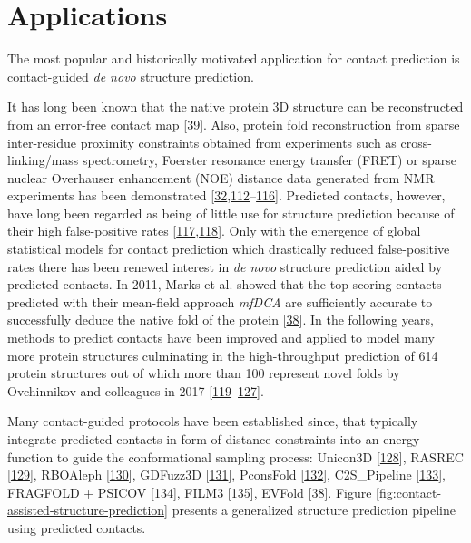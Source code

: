 \documentclass[11pt,a4paper,twoside]{book}
\theoremstyle{definition}
\theoremstyle{definition}
\theoremstyle{remark}
\begin{document}
\section{Applications}\label{application-contact-prediction}

The most popular and historically motivated application for contact
prediction is contact-guided \emph{de novo} structure prediction.

It has long been known that the native protein 3D structure can be
reconstructed from an error-free contact map
{[}\protect\hyperlink{ref-Vendruscolo1997}{39}{]}. Also, protein fold
reconstruction from sparse inter-residue proximity constraints obtained
from experiments such as cross-linking/mass spectrometry, Foerster
resonance energy transfer (FRET) or sparse nuclear Overhauser
enhancement (NOE) distance data generated from NMR experiments has been
demonstrated
{[}\protect\hyperlink{ref-Li2004}{32},\protect\hyperlink{ref-Yu2013}{112}--\protect\hyperlink{ref-Aszodi1995a}{116}{]}.
Predicted contacts, however, have long been regarded as being of little
use for structure prediction because of their high false-positive rates
{[}\protect\hyperlink{ref-Wu2011}{117},\protect\hyperlink{ref-Tress2010}{118}{]}.
Only with the emergence of global statistical models for contact
prediction which drastically reduced false-positive rates there has been
renewed interest in \emph{de novo} structure prediction aided by
predicted contacts. In 2011, Marks et al. showed that the top scoring
contacts predicted with their mean-field approach \emph{mfDCA} are
sufficiently accurate to successfully deduce the native fold of the
protein {[}\protect\hyperlink{ref-Marks2011}{38}{]}. In the following
years, methods to predict contacts have been improved and applied to
model many more protein structures culminating in the high-throughput
prediction of 614 protein structures out of which more than 100
represent novel folds by Ovchinnikov and colleagues in 2017
{[}\protect\hyperlink{ref-Hopf2012}{119}--\protect\hyperlink{ref-Ovchinnikov2017}{127}{]}.

Many contact-guided protocols have been established since, that
typically integrate predicted contacts in form of distance constraints
into an energy function to guide the conformational sampling process:
Unicon3D {[}\protect\hyperlink{ref-Bhattacharya2016}{128}{]}, RASREC
{[}\protect\hyperlink{ref-Braun2015}{129}{]}, RBOAleph
{[}\protect\hyperlink{ref-Mabrouk2015a}{130}{]}, GDFuzz3D
{[}\protect\hyperlink{ref-Pietal2015a}{131}{]}, PconsFold
{[}\protect\hyperlink{ref-Michel2014}{132}{]}, C2S\_Pipeline
{[}\protect\hyperlink{ref-Konopka2014}{133}{]}, FRAGFOLD + PSICOV
{[}\protect\hyperlink{ref-Kosciolek2014}{134}{]}, FILM3
{[}\protect\hyperlink{ref-Nugent2012}{135}{]}, EVFold
{[}\protect\hyperlink{ref-Marks2011}{38}{]}. Figure
\ref{fig:contact-assisted-structure-prediction} presents a generalized
structure prediction pipeline using predicted contacts.
\end{document}
